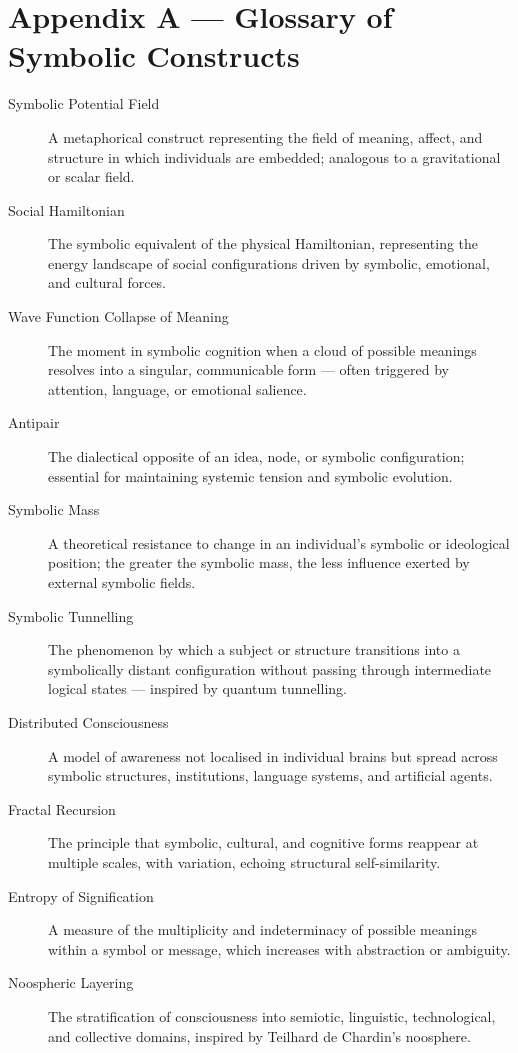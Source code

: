 \section*{Appendix A — Glossary of Symbolic Constructs}

\begin{description}
  \item[Symbolic Potential Field] A metaphorical construct representing the field of meaning, affect, and structure in which individuals are embedded; analogous to a gravitational or scalar field.

  \item[Social Hamiltonian] The symbolic equivalent of the physical Hamiltonian, representing the energy landscape of social configurations driven by symbolic, emotional, and cultural forces.

  \item[Wave Function Collapse of Meaning] The moment in symbolic cognition when a cloud of possible meanings resolves into a singular, communicable form — often triggered by attention, language, or emotional salience.

  \item[Antipair] The dialectical opposite of an idea, node, or symbolic configuration; essential for maintaining systemic tension and symbolic evolution.

  \item[Symbolic Mass] A theoretical resistance to change in an individual's symbolic or ideological position; the greater the symbolic mass, the less influence exerted by external symbolic fields.

  \item[Symbolic Tunnelling] The phenomenon by which a subject or structure transitions into a symbolically distant configuration without passing through intermediate logical states — inspired by quantum tunnelling.

  \item[Distributed Consciousness] A model of awareness not localised in individual brains but spread across symbolic structures, institutions, language systems, and artificial agents.

  \item[Fractal Recursion] The principle that symbolic, cultural, and cognitive forms reappear at multiple scales, with variation, echoing structural self-similarity.

  \item[Entropy of Signification] A measure of the multiplicity and indeterminacy of possible meanings within a symbol or message, which increases with abstraction or ambiguity.

  \item[Noospheric Layering] The stratification of consciousness into semiotic, linguistic, technological, and collective domains, inspired by Teilhard de Chardin's noosphere.
\end{description}